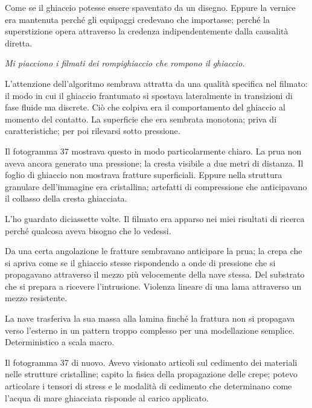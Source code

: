 Come se il ghiaccio potesse essere spaventato da un disegno. Eppure la vernice era mantenuta perché gli equipaggi credevano che importasse; perché la superstizione opera attraverso la credenza indipendentemente dalla causalità diretta.

\textit{Mi piacciono i filmati dei rompighiaccio che rompono il ghiaccio.}

L'attenzione dell'algoritmo sembrava attratta da una qualità specifica nel filmato: il modo in cui il ghiaccio frantumato si spostava lateralmente in transizioni di fase fluide ma discrete. Ciò che colpiva era il comportamento del ghiaccio al momento del contatto. La superficie che era sembrata monotona; priva di caratteristiche; per poi rilevarsi sotto pressione.

Il fotogramma 37 mostrava questo in modo particolarmente chiaro. La prua non aveva ancora generato una pressione; la cresta visibile a due metri di distanza. Il foglio di ghiaccio non mostrava fratture superficiali. Eppure nella struttura granulare dell'immagine era cristallina; artefatti di compressione che anticipavano il collasso della cresta ghiacciata.


L'ho guardato diciassette volte. Il filmato era apparso nei miei risultati di ricerca perché qualcosa aveva bisogno che lo vedessi.

Da una certa angolazione le fratture sembravano anticipare la prua; la crepa che si apriva come se il ghiaccio stesse rispondendo a onde di pressione che si propagavano attraverso il mezzo più velocemente della nave stessa. Del substrato che si prepara a ricevere l'intrusione. Violenza lineare di una lama attraverso un mezzo resistente.

La nave trasferiva la sua massa alla lamina finché la frattura non si propagava verso l'esterno in un pattern troppo complesso per una modellazione semplice. Deterministico a scala macro.

Il fotogramma 37 di nuovo. Avevo visionato articoli sul cedimento dei materiali nelle strutture cristalline; capito la fisica della propagazione delle crepe; potevo articolare i tensori di stress e le modalità di cedimento che determinano come l'acqua di mare ghiacciata risponde al carico applicato.

